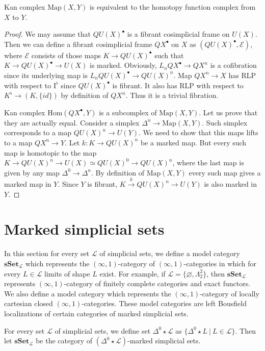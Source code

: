 \documentclass[reqno]{amsart}
\theoremstyle{definition}
\theoremstyle{remark}
\newcommand{\cat}[1]{\mathbf{#1}}
\newcommand{\sSet}{\cat{sSet}}
\newcommand{\csSet}{\sSet_\mathcal{L}}
\newcommand{\join}{\star}
\newcommand{\Hom}{\mathrm{Hom}}
\newcommand{\Map}{\mathrm{Map}}
\newcommand{\I}{\mathrm{I}}
\numberwithin{figure}{section}
\begin{document}
\begin{lem}
Kan complex $\Map(X,Y)$ is equivalent to the homotopy function complex from $X$ to $Y$.
\end{lem}
\begin{proof}
We may assume that $QU(X)^\bullet$ is a fibrant cosimplicial frame on $U(X)$.
Then we can define a fibrant cosimplicial frame $QX^\bullet$ on $X$ as $(QU(X)^\bullet,\mathcal{E})$,
where $\mathcal{E}$ consists of those maps $K \to QU(X)^\bullet$ such that $K \to QU(X)^\bullet \to U(X)$ is marked.
Obviously, $L_n QX^\bullet \to QX^n$ is a cofibration since its underlying map is $L_n QU(X)^\bullet \to QU(X)^n$.
Map $QX^n \to X$ has RLP with respect to $\I^\flat$ since $QU(X)^\bullet$ is fibrant.
It also has RLP with respect to $K^\flat \to (K,\{id\})$ by definition of $QX^n$.
Thus it is a trivial fibration.

Kan complex $\Hom(QX^\bullet,Y)$ is a subcomplex of $\Map(X,Y)$.
Let us prove that they are actually equal.
Consider a simplex $\Delta^n \to \Map(X,Y)$.
Such simplex corresponds to a map $QU(X)^n \to U(Y)$.
We need to show that this maps lifts to a map $QX^n \to Y$.
Let $k : K \to QU(X)^n$ be a marked map.
But every such map is homotopic to the map $K \to QU(X)^n \to U(X) \simeq QU(X)^0 \to QU(X)^n$,
where the last map is given by any map $\Delta^0 \to \Delta^n$.
By definition of $\Map(X,Y)$ every such map gives a marked map in $Y$.
Since $Y$ is fibrant, $K \xrightarrow{k} QU(X)^n \to U(Y)$ is also marked in $Y$.
\end{proof}

\section{Marked simplicial sets}

In this section for every set $\mathcal{L}$ of simplicial sets, we define a model category $\csSet$
which represents the $(\infty,1)$-category of $(\infty,1)$-categories in which for every $L \in \mathcal{L}$ limits of shape $L$ exist.
For example, if $\mathcal{L} = \{ \varnothing, \Lambda^2_2 \}$, then $\csSet$ represents $(\infty,1)$-category of finitely complete categories and exact functors.
We also define a model category which represents the $(\infty,1)$-category of locally cartesian closed $(\infty,1)$-categories.
These model categories are left Bousfield localizations of certain categories of marked simplicial sets.

For every set $\mathcal{L}$ of simplicial sets, we define set $\Delta^0 \join \mathcal{L}$ as $\{ \Delta^0 \join L\ |\ L \in \mathcal{L} \}$.
Then let $\csSet$ be the category of $(\Delta^0 \join \mathcal{L})$-marked simplicial sets.
\end{document}
